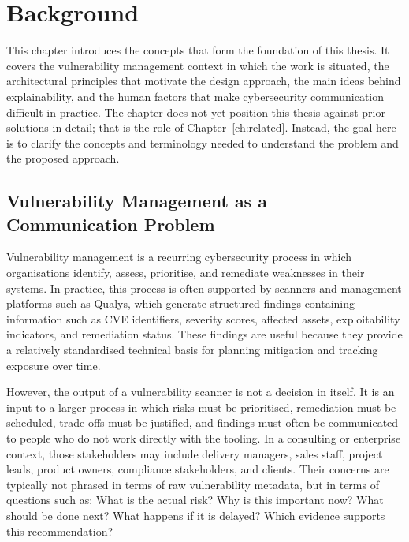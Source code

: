 \chapter{Background}%
\label{ch:background}

This chapter introduces the concepts that form the foundation of this thesis. It covers the vulnerability management context in which the work is situated, the architectural principles that motivate the design approach, the main ideas behind explainability, and the human factors that make cybersecurity communication difficult in practice. The chapter does not yet position this thesis against prior solutions in detail; that is the role of Chapter~\ref{ch:related}. Instead, the goal here is to clarify the concepts and terminology needed to understand the problem and the proposed approach.

\section{Vulnerability Management as a Communication Problem}

Vulnerability management is a recurring cybersecurity process in which organisations identify, assess, prioritise, and remediate weaknesses in their systems. In practice, this process is often supported by scanners and management platforms such as Qualys, which generate structured findings containing information such as CVE identifiers, severity scores, affected assets, exploitability indicators, and remediation status. These findings are useful because they provide a relatively standardised technical basis for planning mitigation and tracking exposure over time.

However, the output of a vulnerability scanner is not a decision in itself. It is an input to a larger process in which risks must be prioritised, remediation must be scheduled, trade-offs must be justified, and findings must often be communicated to people who do not work directly with the tooling. In a consulting or enterprise context, those stakeholders may include delivery managers, sales staff, project leads, product owners, compliance stakeholders, and clients. Their concerns are typically not phrased in terms of raw vulnerability metadata, but in terms of questions such as: What is the actual risk? Why is this important now? What should be done next? What happens if it is delayed? Which evidence supports this recommendation?

